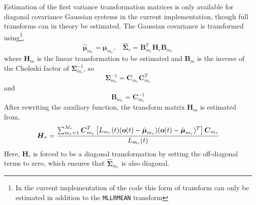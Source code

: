 
Estimation of the first variance transformation matrices is only available
for diagonal covariance Gaussian systems in the current implementation,
though full transforms can in theory be estimated. The Gaussian covariance is
transformed using\footnote{In the current implementation of the code this
form of transform can only be estimated in addition to the {\tt MLLRMEAN} 
transform},
\[
        \hat{\bm{\mu}}_{m_r} = \bm{\mu}_{m_r}, \:\:\:\: 
        \hat{\bm{\Sigma}}_{r} = \bm{B}_{m_r}^T\bm{H}_r\bm{B}_{m_r}
\]
where $\bm{H}_m$ is the linear transformation to be estimated and
$\bm{B}_m$ is the inverse of the Choleski factor of $\bm{\Sigma}_{m_r}^{-1}$,
so
\[ 
        \bm{\Sigma}_{m_r}^{-1} = \bm{C}_{m_r}\bm{C}_{m_r}^T
\]
and
\[
        \bm{B}_{m_r} = \bm{C}_{m_r}^{-1}
\]
After rewriting the auxiliary function, the transform matrix $\bm{H}_m$
is estimated from,
\[
        {\mbox{\boldmath $H$}}_r = \frac{ \sum_{m_r=1}^{M_r}{\mbox{\boldmath $C$}}_{m_r}^T 
                          \left[
                            L_{m_r}(t)({\mbox{\boldmath $o$}}(t) - \hat{{\mbox{\boldmath $\mu$}}}_{m_r})
                                   ({\mbox{\boldmath $o$}}(t) - \hat{{\mbox{\boldmath $\mu$}}}_{m_r})^T
                          \right]
                          {\mbox{\boldmath $C$}}_{m_r}
                        }
                        { L_{m_r}(t) }
\]
Here, $\bm{H}_r$ is forced to be a diagonal transformation by setting
the off-diagonal terms to zero, which ensures that
$\hat{\bm{\Sigma}}_{m_r}$ is also diagonal.

